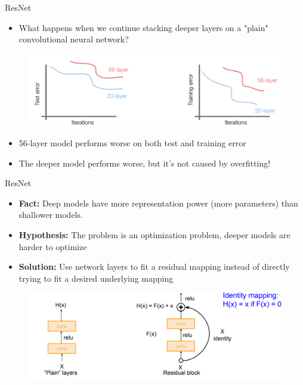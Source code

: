 \documentclass[10pt]{beamer}
\theoremstyle{remark}
\theoremstyle{definition}
\begin{document}
\begin{frame}{ResNet}
\begin{itemize}
    \item What happens when we continue stacking deeper layers on a "plain" convolutional 
neural network?

\end{itemize}
\pause
\begin{figure}
\centering
\includegraphics[width=1.0\textwidth,height=0.5\textheight,keepaspectratio]{./images/resnet_2.png}
\end{figure}

\pause
\begin{itemize}
    \item 56-layer model performs worse on both test and training error
    \pause
    \item The deeper model performs worse, but it’s not caused by overfitting!
\end{itemize}

\end{frame}


\begin{frame}{ResNet}
\begin{itemize}
    \item \textbf{Fact:} Deep models have more representation power (more parameters) than shallower models.
    \pause
    \item \textbf{Hypothesis:} The problem is an optimization problem, deeper models are harder to optimize
    \pause
    \item \textbf{Solution:} Use network layers to fit a residual mapping instead of directly trying to fit a 
 desired underlying mapping

\end{itemize}
\pause
\begin{figure}
\centering
\includegraphics[width=1.0\textwidth,height=0.5\textheight,keepaspectratio]{./images/resnet_3.png}
\end{figure}


\end{frame}
\end{document}
